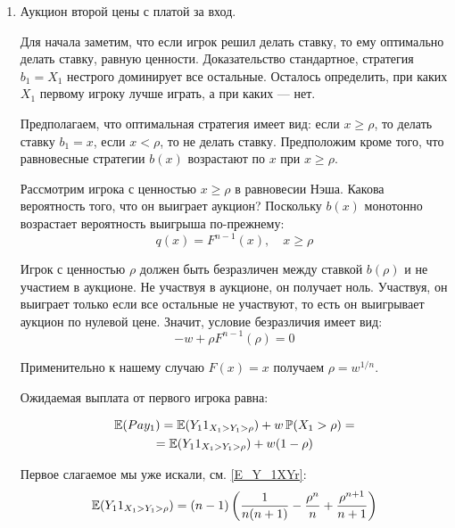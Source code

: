 \begin{enumerate}
\item Аукцион второй цены с платой за вход.


Для начала заметим, что если игрок решил делать ставку, то ему оптимально делать ставку, равную ценности. Доказательство стандартное, стратегия $ b_{1}=X_{1} $ нестрого доминирует все остальные. Осталось определить, при каких $ X_{1} $ первому игроку лучше играть, а при каких  — нет.

Предполагаем, что оптимальная стратегия имеет вид: если $ x\geq \rho $, то делать ставку $ b_{1}=x $, если $ x<\rho $, то не делать ставку. Предположим кроме того, что равновесные стратегии $ b(x) $ возрастают по $ x $ при $ x\geq \rho $.

Рассмотрим игрока с ценностью $ x\geq \rho $ в равновесии Нэша. Какова вероятность того, что он выиграет аукцион? Поскольку $ b(x) $ монотонно возрастает вероятность выигрыша по-прежнему:
\begin{equation}
q(x)=F^{n-1}(x),\quad x\geq \rho
\end{equation}

Игрок с ценностью $ \rho $ должен быть безразличен между ставкой $ b(\rho) $ и не участием в аукционе. Не участвуя в аукционе, он получает ноль. Участвуя, он выиграет только если все остальные не участвуют, то есть он выигрывает аукцион по нулевой цене. Значит, условие безразличия имеет вид:
\begin{equation}
-w+\rho F^{n-1}(\rho)=0
\end{equation}

Применительно к нашему случаю $ F(x)=x $ получаем $ \rho=w^{1/n} $.


Ожидаемая выплата от первого игрока равна:

\begin{multline}
\operatorname{\mathbb{E}}(Pay_{1})=\operatorname{\mathbb{E}}(Y_{1}1_{X_{1}>Y_{1}>\rho})+w\operatorname{\mathbb{P}}(X_{1}>\rho)=\\
=\operatorname{\mathbb{E}}(Y_{1}1_{X_{1}>Y_{1}>\rho})+w(1-\rho)
\end{multline}

Первое слагаемое мы уже искали, см. \ref{E_Y_1XYr}:
\begin{equation}
\operatorname{\mathbb{E}}(Y_{1}1_{X_{1}>Y_{1}>\rho})=(n-1)\left(\frac{1}{n(n+1)}-\frac{\rho^{n}}{n}+\frac{\rho^{n+1}}{n+1}\right)
\end{equation}


\end{enumerate}
